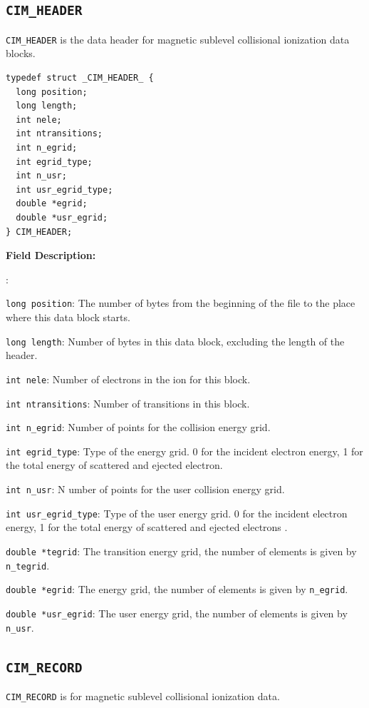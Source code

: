 \documentclass[twoside,letterpaper]{refrep}
\newenvironment{dbdesc}{\textbf{Field Description:} \begin{list}
	{:}{\setlength{\labelwidth}{2in}
	   \setlength{\leftmargin}{2in}
	   \setlength{\labelsep}{0.1in}
	   \setlength{\rightmargin}{0.2in}}}
	{\end{list}}
\begin{document}
\subsection{\texttt{CIM\_HEADER}}
\texttt{CIM\_HEADER} is the data header for magnetic sublevel collisional
ionization data blocks. 

\begin{verbatim}
typedef struct _CIM_HEADER_ {
  long position;
  long length;
  int nele;
  int ntransitions;
  int n_egrid;
  int egrid_type;
  int n_usr;
  int usr_egrid_type;
  double *egrid;
  double *usr_egrid;
} CIM_HEADER;
\end{verbatim}

\begin{dbdesc}
\item[\texttt{long position}:] The number of bytes from the beginning of the
file to the place where this data block starts.
\item[\texttt{long length}:] Number of bytes in this data block, excluding the
length of the header.
\item[\texttt{int nele}:] Number of electrons in the ion for this block.
\item[\texttt{int ntransitions}:] Number of transitions in this block.
\item[\texttt{int n\_egrid}:] Number of points for the collision energy grid.
\item[\texttt{int egrid\_type}:] Type of the energy grid. 0 for the incident
electron energy, 1 for the total energy of scattered and ejected electron.
\item[\texttt{int n\_usr}:]N umber of points for the user collision energy
grid.
\item[\texttt{int usr\_egrid\_type}:] Type of the user energy grid. 0 for the
incident electron energy, 1 for the total energy of scattered and ejected
electrons .
\item[\texttt{double *tegrid}:] The transition energy grid, the number of
elements is given by \texttt{n\_tegrid}.
\item[\texttt{double *egrid}:] The energy grid, the number of elements is
given by \texttt{n\_egrid}.
\item[\texttt{double *usr\_egrid}:] The user energy grid, the number of
elements is given by \texttt{n\_usr}.
\end{dbdesc}

\subsection{\texttt{CIM\_RECORD}}
\texttt{CIM\_RECORD} is for magnetic sublevel collisional ionization data.
\end{document}
